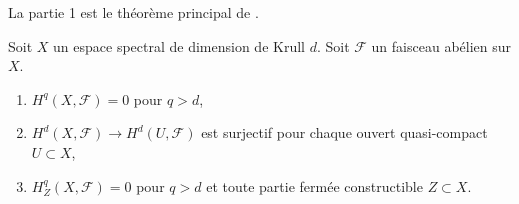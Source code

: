 \begin{proposition}

\label{proposition-cohomological-dimension-spectral}

\begin{reference}

La partie 1 est le théorème principal de \cite{Scheiderer}.

\end{reference}

Soit $X$ un espace spectral de dimension de Krull $d$. Soit $\mathcal{F}$ un faisceau abélien sur $X$.

\begin{enumerate}

\item  $H^q(X, \mathcal{F}) = 0$ pour $q > d$,
\item  $H^d(X, \mathcal{F}) \to H^d(U, \mathcal{F})$ est surjectif pour chaque ouvert quasi-compact $U \subset X$,
\item  $H^q_Z(X, \mathcal{F}) = 0$ pour $q > d$ et toute partie fermée constructible $Z \subset X$.

\end{enumerate}

\end{proposition}

